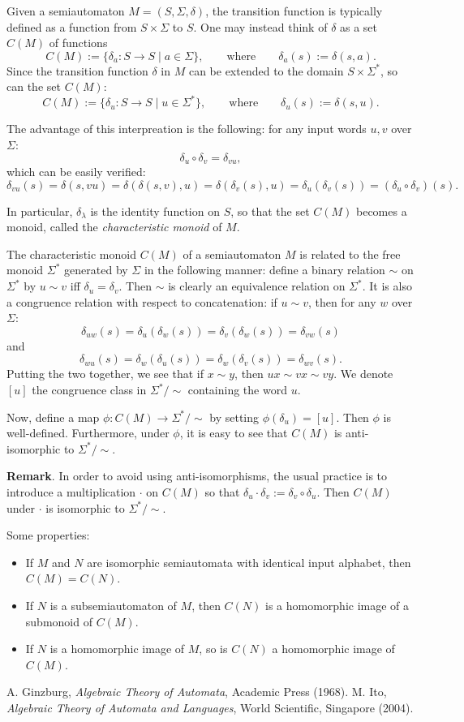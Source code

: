 \documentclass[12pt]{article}
\begin{document}
Given a semiautomaton $M=(S,\Sigma,\delta)$, the transition function is typically defined as a function from $S\times \Sigma$ to $S$.  One may instead think of $\delta$ as a set $C(M)$ of functions $$C(M):=\lbrace \delta_a: S\to S \mid a \in \Sigma \rbrace, \qquad \mbox{where} \qquad \delta_a(s):=\delta(s,a).$$
Since the transition function $\delta$ in $M$ can be extended to the domain $S\times \Sigma^*$, so can the set $C(M)$: $$C(M):=\lbrace \delta_u: S\to S\mid u\in \Sigma^*\rbrace,\qquad \mbox{where}\qquad \delta_u(s):=\delta(s,u).$$

The advantage of this interpreation is the following: for any input words $u,v$ over $\Sigma$: $$\delta_u\circ \delta_v= \delta_{vu},$$
which can be easily verified:
$$\delta_{vu}(s)=\delta(s,vu)=\delta(\delta(s,v),u) = \delta(\delta_v(s),u)=\delta_u(\delta_v(s))=(\delta_u\circ \delta_v)(s).$$

In particular, $\delta_{\lambda}$ is the identity function on $S$, so that the set $C(M)$ becomes a monoid, called the \emph{characteristic monoid} of $M$.

The characteristic monoid $C(M)$ of a semiautomaton $M$ is related to the free monoid $\Sigma^*$ generated by $\Sigma$ in the following manner: define a binary relation $\sim$ on $\Sigma^*$ by $u\sim v$ iff $\delta_u = \delta_v$.  Then $\sim$ is clearly an equivalence relation on $\Sigma^*$.  It is also a congruence relation with respect to concatenation: if $u\sim v$, then for any $w$ over $\Sigma$:
$$\delta_{uw}(s)=\delta_u(\delta_w(s))=\delta_v(\delta_w(s))=\delta_{vw}(s)$$
and
$$\delta_{wu}(s)=\delta_w(\delta_u(s))=\delta_w(\delta_v(s))=\delta_{wv}(s).$$
Putting the two together, we see that if $x\sim y$, then $ux \sim vx \sim vy$.  We denote $[u]$ the congruence class in $\Sigma^*/\sim$ containing the word $u$.

Now, define a map $\phi: C(M)\to \Sigma^*/\sim$ by setting $\phi(\delta_u)=[u]$.  Then $\phi$ is well-defined.  Furthermore, under $\phi$, it is easy to see that $C(M)$ is anti-isomorphic to $\Sigma^*/\sim$.

\textbf{Remark}.  In order to avoid using anti-isomorphisms, the usual practice is to introduce a multiplication $\cdot$ on $C(M)$ so that $\delta_u \cdot \delta_v:=\delta_v \circ \delta_u$.  Then $C(M)$ under $\cdot$ is isomorphic to $\Sigma^*/\sim$.

Some properties:
\begin{itemize}
\item If $M$ and $N$ are isomorphic semiautomata with identical input alphabet, then $C(M)=C(N)$.
\item If $N$ is a subsemiautomaton of $M$, then $C(N)$ is a homomorphic image of a submonoid of $C(M)$.
\item If $N$ is a homomorphic image of $M$, so is $C(N)$ a homomorphic image of $C(M)$.
\end{itemize}

\begin{thebibliography}{8}
 A. Ginzburg, {\em Algebraic Theory of Automata}, Academic Press (1968).
 M. Ito, {\em Algebraic Theory of Automata and Languages}, World Scientific, Singapore (2004).
\end{thebibliography}
\end{document}
